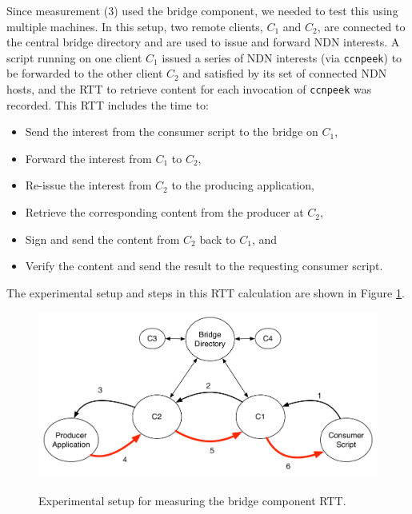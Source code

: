 Since measurement (3) used the bridge component, we needed to test this using multiple machines. In this setup, two remote clients, $C_1$ and $C_2$, are connected to the central bridge directory and are used to issue and forward NDN interests. A script running on one client $C_1$ issued a series of NDN interests (via {\tt ccnpeek}) to be forwarded to the other client $C_2$ and satisfied by its set of connected NDN hosts, and the RTT to retrieve content for each invocation of {\tt ccnpeek} was recorded. This RTT includes the time to:
\begin{itemize} 
	\item Send the interest from the consumer script to the bridge on $C_1$, 
	\item Forward the interest from $C_1$ to $C_2$, 
	\item Re-issue the interest from $C_2$ to the producing application, 
	\item Retrieve the corresponding content from the producer at $C_2$,
	\item Sign and send the content from $C_2$ back to $C_1$, and
	\item Verify the content and send the result to the requesting consumer script.
\end{itemize}
The experimental setup and steps in this RTT calculation are shown in Figure \ref{fig:exp-bridge}.

\begin{figure}
\begin{center}
\includegraphics[scale=0.4]{./images/experiment.pdf}
\label{fig:exp-bridge}
\caption{Experimental setup for measuring the bridge component RTT.}
\end{center}
\end{figure}


